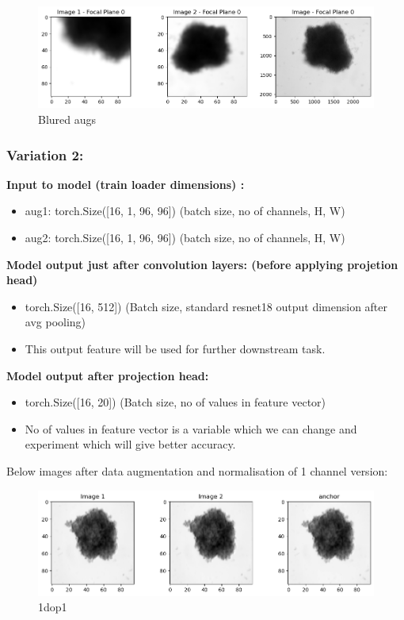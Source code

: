 \documentclass[a4paper,12pt]{report}
\begin{document}
  \begin{figure}[H]
    \centering
    \includegraphics[width=0.9\linewidth]{figures/op4.png} %
    \caption{Blured augs}
    \label{fig:output4}
  \end{figure}
\subsubsection{Variation 2:}

\textbf{Input to model (train loader dimensions) :} 
\begin{itemize}
   \item aug1: torch.Size([16, 1, 96, 96])        (batch size, no of channels, H, W)
   \item aug2: torch.Size([16, 1, 96, 96])        (batch size, no of channels, H, W) \vspace{1em}
\end{itemize}
\textbf{Model output just after convolution layers: (before applying projetion head)} 
\begin{itemize}
  \item torch.Size([16, 512]) (Batch size, standard resnet18 output dimension after avg pooling)   
  \item This output feature will be used for further downstream task.  \vspace{1em}
\end{itemize}

\textbf{Model output after projection head:}
\begin{itemize}
  \item torch.Size([16, 20])  (Batch size, no of values in feature vector)  
  \item No of values in feature vector is a variable which we can change and experiment which will give better accuracy.
\end{itemize}

Below images after data augmentation and normalisation of 1 channel version:
\begin{figure}[H]
  \centering
  \includegraphics[width=0.9\linewidth]{figures/1dop1.png} %
  \caption{1dop1}
  \label{fig:1doutput1}
\end{figure}
\end{document}
